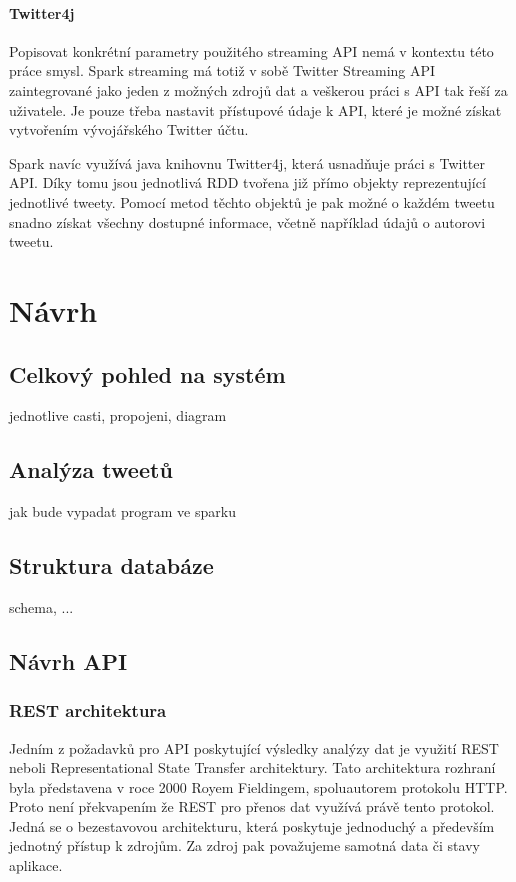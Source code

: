 \documentclass[thesis=B,czech]{FITthesis}[2012/06/26]
\begin{document}
\subsubsection{Twitter4j}
	Popisovat konkrétní parametry použitého streaming API nemá v kontextu této práce smysl. Spark streaming má totiž v sobě Twitter Streaming API zaintegrované jako jeden z možných zdrojů dat a veškerou práci s API tak řeší za uživatele. Je pouze třeba nastavit přístupové údaje k API, které je možné získat vytvořením vývojářského Twitter účtu. 
	
	Spark navíc využívá java knihovnu Twitter4j\cite{twitter4j}, která usnadňuje práci s Twitter API. Díky tomu jsou jednotlivá RDD tvořena již přímo objekty reprezentující jednotlivé tweety. Pomocí metod těchto objektů je pak možné o každém tweetu snadno získat všechny dostupné informace, včetně například údajů o autorovi tweetu. 


\chapter{Návrh}
\section{Celkový pohled na systém}
	jednotlive casti, propojeni, diagram 
\section{Analýza tweetů}
	jak bude vypadat program ve sparku

\section{Struktura databáze}
	schema, ...
\section{Návrh API}
\label{rest}
\subsection{REST architektura}
	Jedním z požadavků pro API poskytující výsledky analýzy dat je využití REST neboli Representational State Transfer architektury. Tato architektura rozhraní byla představena v roce 2000 Royem Fieldingem, spoluautorem protokolu HTTP. Proto není překvapením že REST pro přenos dat využívá právě tento protokol. Jedná se o bezestavovou architekturu, která poskytuje jednoduchý a především jednotný přístup k zdrojům. Za zdroj pak považujeme samotná data či stavy aplikace. 
	
\end{document}
